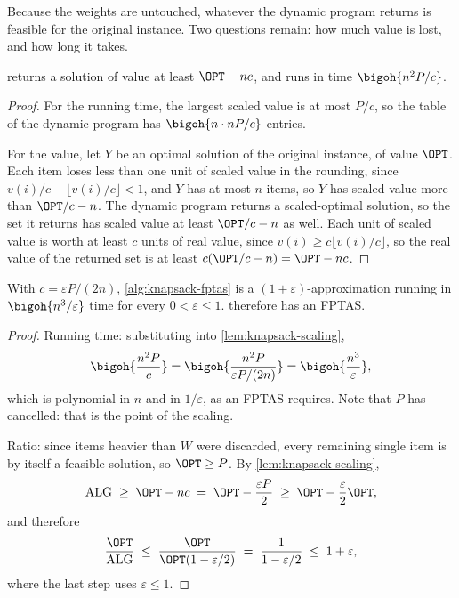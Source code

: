 Because the weights are untouched, whatever the dynamic program returns is
feasible for the original instance. Two questions remain: how much value is
lost, and how long it takes.

\begin{lemma}\label{lem:knapsack-scaling}
 returns a solution of value at least $\OPT - nc$, and
runs in time $\bigoh{n^2P/c}$.
\end{lemma}

\begin{proof}
For the running time, the largest scaled value is at most $P/c$, so the table of
the dynamic program has $\bigoh{n \cdot nP/c}$ entries.

For the value, let $Y$ be an optimal solution of the original instance, of value
$\OPT$. Each item loses less than one unit of scaled value in the rounding,
since $v(i)/c - \lfloor v(i)/c\rfloor < 1$, and $Y$ has at most $n$ items, so
$Y$ has scaled value more than $\OPT/c - n$. The dynamic program returns a
scaled-optimal solution, so the set it returns has scaled value at least
$\OPT/c - n$ as well. Each unit of scaled value is worth at least $c$ units of
real value, since $v(i) \ge c\lfloor v(i)/c \rfloor$, so the real value of the
returned set is at least $c(\OPT/c - n) = \OPT - nc$.
\end{proof}

\begin{theorem}\label{thm:knapsack-fptas}
With $c = \varepsilon P / (2n)$, \cref{alg:knapsack-fptas} is a
$(1+\varepsilon)$-approximation running in $\bigoh{n^3/\varepsilon}$ time for
every $0 < \varepsilon \le 1$.  therefore has an FPTAS.
\end{theorem}

\begin{proof}
Running time: substituting into \cref{lem:knapsack-scaling},
\[ \bigoh{\frac{n^2 P}{c}} = \bigoh{\frac{n^2P}{\varepsilon P/(2n)}}
   = \bigoh{\frac{n^3}{\varepsilon}}, \]
which is polynomial in $n$ and in $1/\varepsilon$, as an FPTAS requires. Note
that $P$ has cancelled: that is the point of the scaling.

Ratio: since items heavier than $W$ were discarded, every remaining single item
is by itself a feasible solution, so $\OPT \ge P$. By
\cref{lem:knapsack-scaling},
\[ \mathrm{ALG} \;\ge\; \OPT - nc \;=\; \OPT - \frac{\varepsilon P}{2}
   \;\ge\; \OPT - \frac{\varepsilon}{2}\OPT, \]
and therefore
\[ \frac{\OPT}{\mathrm{ALG}} \;\le\; \frac{\OPT}{\OPT(1 - \varepsilon/2)}
   \;=\; \frac{1}{1-\varepsilon/2} \;\le\; 1 + \varepsilon, \]
where the last step uses $\varepsilon \le 1$.
\end{proof}


